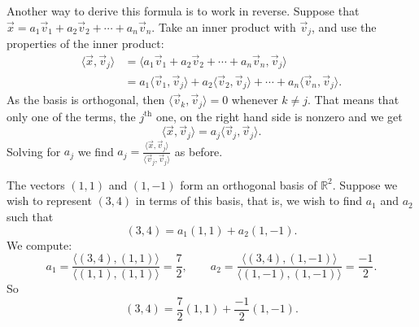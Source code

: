 Another way to derive this formula is to work in reverse.  Suppose that
$\vec{x} =
a_1 \vec{v}_1 + 
a_2 \vec{v}_2 + \cdots +
a_n \vec{v}_n$.  Take an inner product with $\vec{v}_j$, and
use the properties of the inner product:
\begin{equation*}
\begin{split}
\langle \vec{x} , \vec{v}_j \rangle
& =
\langle a_1 \vec{v}_1 + 
a_2 \vec{v}_2 + \cdots +
a_n \vec{v}_n , \vec{v}_j \rangle
\\
& =
a_1 \langle \vec{v}_1 , \vec{v}_j \rangle + 
a_2 \langle \vec{v}_2 , \vec{v}_j \rangle + 
\cdots +
a_n \langle \vec{v}_n , \vec{v}_j \rangle .
\end{split}
\end{equation*}
As the basis is orthogonal, then
$\langle \vec{v}_k , \vec{v}_j \rangle = 0$ whenever
$k \not= j$.  That means that only one of the terms, the $j^{\text{th}}$ one,
on the right
hand side is nonzero and we get
\begin{equation*}
\langle \vec{x} , \vec{v}_j \rangle
=
a_j \langle \vec{v}_j , \vec{v}_j \rangle .
\end{equation*}
Solving for $a_j$ we find $a_j =
\frac{\langle \vec{x}, \vec{v}_j \rangle}{
\langle \vec{v}_j, \vec{v}_j \rangle
}$ as before.

\begin{example}
The vectors $(1,1)$ and $(1,-1)$ form an orthogonal basis of ${\mathbb{R}}^2$.
Suppose we wish to represent $(3,4)$ in terms of this basis,
that is, we wish to find $a_1$ and $a_2$ such that
\begin{equation*}
(3,4) = a_1 (1,1) + a_2 (1,-1) .
\end{equation*}
We compute:
\begin{equation*}
a_1 = 
\frac{\langle (3,4), (1,1) \rangle}{
\langle (1,1), (1,1) \rangle
}
=
\frac{7}{2}, \qquad
a_2 = 
\frac{\langle (3,4), (1,-1) \rangle}{
\langle (1,-1), (1,-1) \rangle
}
=
\frac{-1}{2} .
\end{equation*}
So
\begin{equation*}
(3,4) = \frac{7}{2} (1,1) + \frac{-1}{2} (1,-1) .
\end{equation*}
\end{example}

